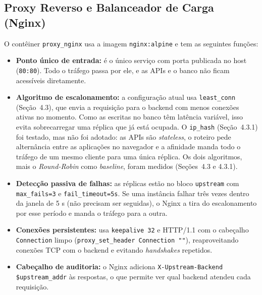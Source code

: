 \documentclass[12pt,a4paper]{article}
\begin{document}
\subsection{Proxy Reverso e Balanceador de Carga (Nginx)}
O contêiner \texttt{proxy\_nginx} usa a imagem \texttt{nginx:alpine} e tem as seguintes funções:
\begin{itemize}
    \item \textbf{Ponto único de entrada:} é o único serviço com porta publicada no host (\texttt{80:80}). Todo o tráfego passa por ele, e as APIs e o banco não ficam acessíveis diretamente.
    \item \textbf{Algoritmo de escalonamento:} a configuração atual usa \texttt{least\_conn} (Seção~4.3), que envia a requisição para o backend com menos conexões ativas no momento. Como as escritas no banco têm latência variável, isso evita sobrecarregar uma réplica que já está ocupada. O \texttt{ip\_hash} (Seção~4.3.1) foi testado, mas não foi adotado: as APIs são \textit{stateless}, o roteiro pede alternância entre as aplicações no navegador e a afinidade manda todo o tráfego de um mesmo cliente para uma única réplica. Os dois algoritmos, mais o \textit{Round-Robin} como \textit{baseline}, foram medidos (Seções~4.3 e 4.3.1).
    \item \textbf{Detecção passiva de falhas:} as réplicas estão no bloco \texttt{upstream} com \texttt{max\_fails=3} e \texttt{fail\_timeout=5s}. Se uma instância falhar três vezes dentro da janela de 5 s (não precisam ser seguidas), o Nginx a tira do escalonamento por esse período e manda o tráfego para a outra.
    \item \textbf{Conexões persistentes:} usa \texttt{keepalive 32} e HTTP/1.1 com o cabeçalho \texttt{Connection} limpo (\texttt{proxy\_set\_header Connection ""}), reaproveitando conexões TCP com o backend e evitando \textit{handshakes} repetidos.
    \item \textbf{Cabeçalho de auditoria:} o Nginx adiciona \texttt{X-Upstream-Backend \$upstream\_addr} às respostas, o que permite ver qual backend atendeu cada requisição.
\end{itemize}
\end{document}
